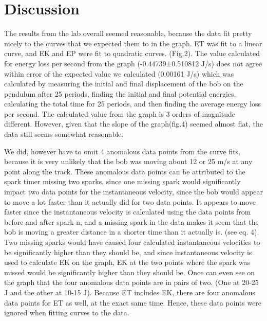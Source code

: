 \documentclass[letterpaper]{article}
\begin{document}
\section{Discussion}
The results from the lab overall seemed reasonable, because the data fit pretty nicely to the curves that we expected them to in the graph. ET was fit to a linear curve, and EK and EP were fit to quadratic curves.  (Fig.2).  The value calculated for energy loss per second from the graph (-0.44739±0.510812 J/s) does not agree within error of the expected value we calculated (0.00161 J/s) which was calculated by measuring the initial and final displacement of the bob on the pendulum after 25 periods, finding the initial and final potential energies, calculating the total time for 25 periods, and then finding the average energy loss per second. The calculated value from the graph is 3 orders of magnitude different. However, given that the slope of the graph(fig.4) seemed almost flat, the data still seems somewhat reasonable.

We did, however have to omit 4 anomalous data points from the curve fits, because it is very unlikely that the bob was moving about 12 or 25 m/s at any point along the track. These anomalous data points can be attributed to the spark timer missing two sparks, since one missing spark would significantly impact two data points for the instantaneous velocity, since the bob would appear to move a lot faster than it actually did for two data points. It appears to move faster since the instantaneous velocity is calculated using the data points from before and after spark n, and a missing spark in the data makes it seem that the bob is moving a greater distance in a shorter time than it actually is. (see eq. 4). Two missing sparks would have caused four calculated instantaneous velocities to be significantly higher than they should be, and since instantaneous velocity is used to calculate EK on the graph, EK at the two points where the spark was missed would be significantly higher than they should be. Once can even see on the graph that the four anomalous data points are in pairs of two. (One at 20-25 J and the other at 10-15 J). Because ET includes EK, there are four anomalous data points for ET as well, at the exact same time.  Hence, these data points were ignored when fitting curves to the data.
\end{document}
